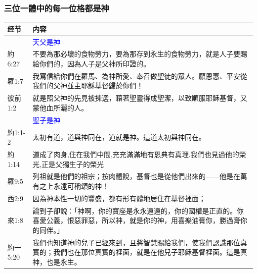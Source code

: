 \subsubsection{三位一體中的每一位格都是神}
\begin{table}[H]
\centering
\begin{tabular}{p{5.6em}p{43em}}  \toprule
经节&内容 \\  \midrule

&\textcolor{blue}{天父是神}\\  \midrule
約6:27&不要為那必壞的食物勞力，要為那存到永生的食物勞力，就是人子要賜給你們的，因為人子是父神所印證的。\\  \midrule
羅1:7&我寫信給你們在羅馬、為神所愛、奉召做聖徒的眾人。願恩惠、平安從我們的父神並主耶穌基督歸於你們！\\  \midrule
彼前1:2&就是照父神的先見被揀選，藉著聖靈得成聖潔，以致順服耶穌基督，又蒙他血所灑的人。\\  \midrule

&\textcolor{blue}{聖子是神}\\  \midrule
約1:1-2&太初有道，道與神同在，道就是神。這道太初與神同在。\\  \midrule
約1:14&道成了肉身,住在我們中間,充充滿滿地有恩典有真理.我們也見過他的榮光,正是父獨生子的榮光\\  \midrule
羅9:5&列祖就是他們的祖宗；按肉體說，基督也是從他們出來的——他是在萬有之上永遠可稱頌的神！\\  \midrule
西2:9&因為神本性一切的豐盛，都有形有體地居住在基督裡面； \\  \midrule
來1:8&論到子卻說：「神啊，你的寶座是永永遠遠的，你的國權是正直的。你喜愛公義，恨惡罪惡，所以神，就是你的神，用喜樂油膏你，勝過膏你的同伴。」\\  \midrule
約一5:20&我們也知道神的兒子已經來到，且將智慧賜給我們，使我們認識那位真實的；我們也在那位真實的裡面，就是在他兒子耶穌基督裡面。這是真神，也是永生。\\  \midrule


\end{tabular}
\end{table}
